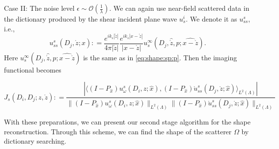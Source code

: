 \documentclass[a4paper,11pt]{article}
\newcommand{\mO}{\mathcal{O}}
\theoremstyle{remark}
\theoremstyle{definition}
\numberwithin{equation}{section}
\begin{document}
\medskip
Case II: The noise level $ \epsilon \sim \mO(\frac{1}{\lambda})$.
 We can again use near-field scattered data in the dictionary produced by the shear incident plane wave $u_{s}^i$. We denote it as $u_{ss}^s$, i.e.,
 \begin{equation}
u_{ss}^s(D_j,\mathring{z};x): =  \frac{e^{ik_s|\mathring{z}|}}{4\pi |\mathring{z}|} \frac{e^{ik_s|x-\mathring{z}|}}{|x-\mathring{z}|}u_{s}^{\infty}(D_j,\hat{\mathring{z}},p;\widehat{x-\mathring{z}}).
\end{equation}
 Here $u_{s}^{\infty}(D_j,\hat{\mathring{z}},p;\widehat{x-\mathring{z}})$ is the same as in \eqref{eq:shape:sp:p}. Then the imaging functional becomes


\begin{equation}\label{eq:indicator:s:multi}
J_{s}(D_i, D_j;z, \mathring{z}): = \frac{|\langle (I - P_{\hat{x}}) u_{\omega}^{s}(D_i,z;\hat{x}),  (I - P_{\hat{x}})\mathring{u}_{ss}^{s}(D_j,\mathring{z};\hat{x})\rangle_{L^2(\Lambda)} | }{\|(I - P_{\hat{x}})u_{\omega}^{s}(D_i,z;\hat{x})\|_{L^2(\Lambda)} \|(I - P_{\hat{x}})\mathring{u}_{ss}^{s}(D_j,\mathring{z};\hat{x})\|_{L^2(\Lambda)} }
\end{equation}


With these preparations, we can present our second stage algorithm for the shape reconstruction. Through this scheme, we can find the shape of the scatterer $\Omega$ by dictionary searching.
\end{document}
